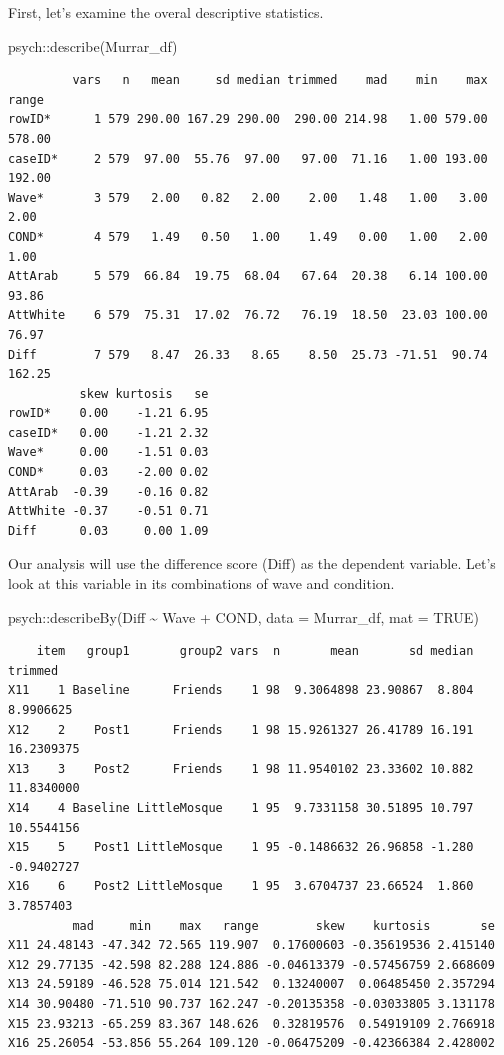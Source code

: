 \documentclass[
  11pt,
]{book}
\newenvironment{Shaded}{\begin{snugshade}}{\end{snugshade}}
\newcommand{\AttributeTok}[1]{\textcolor[rgb]{0.77,0.63,0.00}{#1}}
\newcommand{\ConstantTok}[1]{\textcolor[rgb]{0.00,0.00,0.00}{#1}}
\newcommand{\FunctionTok}[1]{\textcolor[rgb]{0.00,0.00,0.00}{#1}}
\newcommand{\NormalTok}[1]{#1}
\newcommand{\SpecialCharTok}[1]{\textcolor[rgb]{0.00,0.00,0.00}{#1}}
\begin{document}
First, let's examine the overal descriptive statistics.

\begin{Shaded}
\begin{Highlighting}[]
\NormalTok{psych}\SpecialCharTok{::}\FunctionTok{describe}\NormalTok{(Murrar\_df)}
\end{Highlighting}
\end{Shaded}

\begin{verbatim}
         vars   n   mean     sd median trimmed    mad    min    max  range
rowID*      1 579 290.00 167.29 290.00  290.00 214.98   1.00 579.00 578.00
caseID*     2 579  97.00  55.76  97.00   97.00  71.16   1.00 193.00 192.00
Wave*       3 579   2.00   0.82   2.00    2.00   1.48   1.00   3.00   2.00
COND*       4 579   1.49   0.50   1.00    1.49   0.00   1.00   2.00   1.00
AttArab     5 579  66.84  19.75  68.04   67.64  20.38   6.14 100.00  93.86
AttWhite    6 579  75.31  17.02  76.72   76.19  18.50  23.03 100.00  76.97
Diff        7 579   8.47  26.33   8.65    8.50  25.73 -71.51  90.74 162.25
          skew kurtosis   se
rowID*    0.00    -1.21 6.95
caseID*   0.00    -1.21 2.32
Wave*     0.00    -1.51 0.03
COND*     0.03    -2.00 0.02
AttArab  -0.39    -0.16 0.82
AttWhite -0.37    -0.51 0.71
Diff      0.03     0.00 1.09
\end{verbatim}

Our analysis will use the difference score (Diff) as the dependent variable. Let's look at this variable in its combinations of wave and condition.

\begin{Shaded}
\begin{Highlighting}[]
\NormalTok{psych}\SpecialCharTok{::}\FunctionTok{describeBy}\NormalTok{(Diff }\SpecialCharTok{\textasciitilde{}}\NormalTok{ Wave }\SpecialCharTok{+}\NormalTok{ COND, }\AttributeTok{data =}\NormalTok{ Murrar\_df, }\AttributeTok{mat =} \ConstantTok{TRUE}\NormalTok{)}
\end{Highlighting}
\end{Shaded}

\begin{verbatim}
    item   group1       group2 vars  n       mean       sd median    trimmed
X11    1 Baseline      Friends    1 98  9.3064898 23.90867  8.804  8.9906625
X12    2    Post1      Friends    1 98 15.9261327 26.41789 16.191 16.2309375
X13    3    Post2      Friends    1 98 11.9540102 23.33602 10.882 11.8340000
X14    4 Baseline LittleMosque    1 95  9.7331158 30.51895 10.797 10.5544156
X15    5    Post1 LittleMosque    1 95 -0.1486632 26.96858 -1.280 -0.9402727
X16    6    Post2 LittleMosque    1 95  3.6704737 23.66524  1.860  3.7857403
         mad     min    max   range        skew    kurtosis       se
X11 24.48143 -47.342 72.565 119.907  0.17600603 -0.35619536 2.415140
X12 29.77135 -42.598 82.288 124.886 -0.04613379 -0.57456759 2.668609
X13 24.59189 -46.528 75.014 121.542  0.13240007  0.06485450 2.357294
X14 30.90480 -71.510 90.737 162.247 -0.20135358 -0.03033805 3.131178
X15 23.93213 -65.259 83.367 148.626  0.32819576  0.54919109 2.766918
X16 25.26054 -53.856 55.264 109.120 -0.06475209 -0.42366384 2.428002
\end{verbatim}
\end{document}
